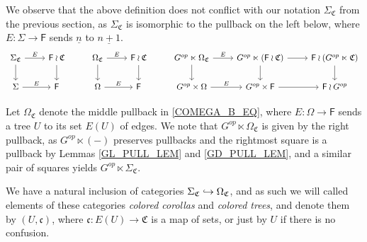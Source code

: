 \documentclass[a4paper,10pt
,draft
]{article}%
\renewcommand{\1}{\eta}%
\newcommand{\SC}{\Sigma_{\mathfrak C}}
\newcommand{\OC}{\Omega_{\mathfrak C}}
\begin{document}
\begin{remark}
      We observe that the above definition does not conflict with our notation $\Sigma_{\mathfrak C}$ from the previous section,
      as $\SC$ is isomorphic to the pullback on the left below,
      where $E: \Sigma \to \mathsf F$ sends $\underline{n}$ to $\underline{n+1}$.
      \begin{equation}
            \label{COMEGA_B_EQ}
            \begin{tikzcd}
                  \SC \arrow[r, "E"] \arrow[d]
                  &
                  \mathsf F \wr \mathfrak C \arrow[d]
                  & %
                  \OC \arrow[d] \arrow[r, "E"]
                  &
                  \mathsf F \wr \mathfrak C \arrow[d]
                  & %
                  G^{op} \ltimes \OC \arrow[d] \arrow[r, "E"]
                  &
                  G^{op} \ltimes (\mathsf F \wr \mathfrak C) \arrow[d] \arrow[r]
                  &
                  \mathsf F \wr (G^{op} \ltimes \mathfrak C) \arrow[d]
                  \\
                  \Sigma \arrow[r, "E"]
                  &
                  \mathsf F
                  & %
                  \Omega \arrow[r, "E"]
                  &
                  \mathsf F
                  & %
                  G^{op} \times \Omega \arrow[r, "E"]
                  &
                  G^{op} \times \mathsf F \arrow[r]
                  &
                  \mathsf F \wr G^{op}
            \end{tikzcd}
      \end{equation}
\end{remark}

\begin{definition}
      Let $\Omega_{\mathfrak C}$ denote the middle pullback in \eqref{COMEGA_B_EQ},
      where $E: \Omega \to \mathsf F$ sends a tree $U$ to its set $E(U)$ of edges.
      We note that $G^{op} \ltimes \OC$ is given by the right pullback,
      as $G^{op} \ltimes (-)$ preserves pullbacks and the rightmost square is a pullback
      by Lemmas \ref{GL_PULL_LEM} and \ref{GD_PULL_LEM},
      and a similar pair of squares yields $G^{op} \ltimes \SC$. 

      We have a natural inclusion of categories $\Sigma_{\mathfrak C} \hookrightarrow \Omega_{\mathfrak C}$,
      and as such we will called elements of these categories
      \textit{colored corollas} and \textit{colored trees},
      and denote them by $(U,\mathfrak c)$, where $\mathfrak c: E(U) \to \mathfrak C$ is a map of sets,
      or just by $U$ if there is no confusion.
\end{definition}
\end{document}
